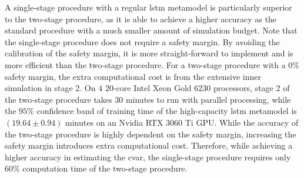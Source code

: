 A single-stage procedure with a regular \gls{lstm} metamodel is particularly superior to the two-stage procedure, as it is able to achieve a higher accuracy as the standard procedure with a much smaller amount of simulation budget.
Note that the single-stage procedure does not require a safety margin.
By avoiding the calibration of the safety margin, it is more straight-forward to implement and is more efficient than the two-stage procedure.
For a two-stage procedure with a $0\%$ safety margin, the extra computational cost is from the extensive inner simulation in stage 2.
On $4$ $20$-core Intel Xeon Gold $\num{6230}$ processors, stage 2 of the two-stage procedure takes $30$ minutes to run with parallel processing, while the $95\%$ confidence band of training time of the high-capacity \gls{lstm} metamodel is $(19.64 \pm 0.94)$ minutes on an Nvidia RTX $\num{3060}$ Ti GPU.
While the accuracy of the two-stage procedure is highly dependent on the safety margin, increasing the safety margin introduces extra computational cost.
Therefore, while achieving a higher accuracy in estimating the \gls{cvar}, the single-stage procedure requires only $60\%$ computation time of the two-stage procedure.

